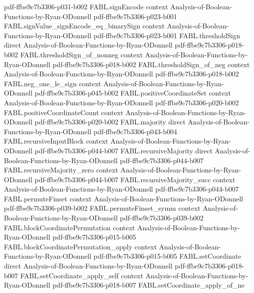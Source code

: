 \begin{theorem}
  {pdf-ffbe9c7b3306-p031-b002}
\proofstep
  {FABL.signEncode}
  {context}
  {Analysis-of-Boolean-Functions-by-Ryan-ODonnell}
  {pdf-ffbe9c7b3306-p023-b001}
\proofstep
  {FABL.signValue_signEncode_eq_binarySign}
  {context}
  {Analysis-of-Boolean-Functions-by-Ryan-ODonnell}
  {pdf-ffbe9c7b3306-p023-b001}
\proofstep
  {FABL.thresholdSign}
  {direct}
  {Analysis-of-Boolean-Functions-by-Ryan-ODonnell}
  {pdf-ffbe9c7b3306-p018-b002}
\proofstep
  {FABL.thresholdSign_of_nonneg}
  {context}
  {Analysis-of-Boolean-Functions-by-Ryan-ODonnell}
  {pdf-ffbe9c7b3306-p018-b002}
\proofstep
  {FABL.thresholdSign_of_neg}
  {context}
  {Analysis-of-Boolean-Functions-by-Ryan-ODonnell}
  {pdf-ffbe9c7b3306-p018-b002}
\proofstep
  {FABL.neg_one_le_sign}
  {context}
  {Analysis-of-Boolean-Functions-by-Ryan-ODonnell}
  {pdf-ffbe9c7b3306-p045-b002}
\proofstep
  {FABL.positiveCoordinateSet}
  {context}
  {Analysis-of-Boolean-Functions-by-Ryan-ODonnell}
  {pdf-ffbe9c7b3306-p020-b002}
\proofstep
  {FABL.positiveCoordinateCount}
  {context}
  {Analysis-of-Boolean-Functions-by-Ryan-ODonnell}
  {pdf-ffbe9c7b3306-p020-b002}
\proofstep
  {FABL.majority}
  {direct}
  {Analysis-of-Boolean-Functions-by-Ryan-ODonnell}
  {pdf-ffbe9c7b3306-p043-b004}
\proofstep
  {FABL.recursiveInputBlock}
  {context}
  {Analysis-of-Boolean-Functions-by-Ryan-ODonnell}
  {pdf-ffbe9c7b3306-p044-b007}
\proofstep
  {FABL.recursiveMajority}
  {direct}
  {Analysis-of-Boolean-Functions-by-Ryan-ODonnell}
  {pdf-ffbe9c7b3306-p044-b007}
\proofstep
  {FABL.recursiveMajority_zero}
  {context}
  {Analysis-of-Boolean-Functions-by-Ryan-ODonnell}
  {pdf-ffbe9c7b3306-p044-b007}
\proofstep
  {FABL.recursiveMajority_succ}
  {context}
  {Analysis-of-Boolean-Functions-by-Ryan-ODonnell}
  {pdf-ffbe9c7b3306-p044-b007}
\proofstep
  {FABL.permuteFinset}
  {context}
  {Analysis-of-Boolean-Functions-by-Ryan-ODonnell}
  {pdf-ffbe9c7b3306-p039-b002}
\proofstep
  {FABL.permuteFinset_symm}
  {context}
  {Analysis-of-Boolean-Functions-by-Ryan-ODonnell}
  {pdf-ffbe9c7b3306-p039-b002}
\proofstep
  {FABL.blockCoordinatePermutation}
  {context}
  {Analysis-of-Boolean-Functions-by-Ryan-ODonnell}
  {pdf-ffbe9c7b3306-p015-b005}
\proofstep
  {FABL.blockCoordinatePermutation_apply}
  {context}
  {Analysis-of-Boolean-Functions-by-Ryan-ODonnell}
  {pdf-ffbe9c7b3306-p015-b005}
\proofstep
  {FABL.setCoordinate}
  {direct}
  {Analysis-of-Boolean-Functions-by-Ryan-ODonnell}
  {pdf-ffbe9c7b3306-p018-b007}
\proofstep
  {FABL.setCoordinate_apply_self}
  {context}
  {Analysis-of-Boolean-Functions-by-Ryan-ODonnell}
  {pdf-ffbe9c7b3306-p018-b007}
\proofstep
  {FABL.setCoordinate_apply_of_ne}

\end{theorem}
